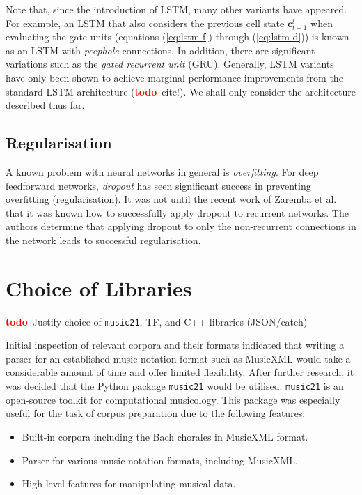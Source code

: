 \documentclass[12pt,a4paper,twoside,openright]{report}
\newcommand{\vect}[1]{\boldsymbol{\mathbf{#1}}}
\newcommand{\todo}{\textcolor{red}{\textbf{todo}~}}
\begin{document}
Note that, since the introduction of LSTM, many other variants have appeared.
For example, an LSTM that also considers the previous cell state
$\vect{c}_{t-1}^l$ when evaluating the gate units (equations (\ref{eq:lstm-f})
through (\ref{eq:lstm-d})) is known as an LSTM with \emph{peephole} connections.
In addition, there are significant variations such as the \emph{gated recurrent
unit} (GRU). Generally, LSTM variants have only been shown to achieve marginal
performance improvements from the standard LSTM architecture (\todo cite!). We
shall only consider the architecture described thus far.

\subsection{Regularisation}

A known problem with neural networks in general is \emph{overfitting}. For deep
feedforward networks, \emph{dropout} \cite{srivastava2014dropout} has seen
significant success in preventing overfitting (regularisation). It was not until
the recent work of Zaremba et al.\ \cite{zaremba2014recurrent} that it was known
how to successfully apply dropout to recurrent networks. The authors determine
that applying dropout to only the non-recurrent connections in the network leads
to successful regularisation. 

\section{Choice of Libraries}

\todo Justify choice of \texttt{music21}, TF, and C++ libraries (JSON/catch)

Initial inspection of relevant corpora and their formats indicated that writing
a parser for an established music notation format such as MusicXML would take a
considerable amount of time and offer limited flexibility. After further
research, it was decided that the Python package \texttt{music21} would be
utilised. \texttt{music21} is an open-source toolkit for computational
musicology. This package was especially useful for the task of corpus
preparation due to the following features:
\begin{itemize}
  \item Built-in corpora including the Bach chorales in MusicXML format.
  \item Parser for various music notation formats, including MusicXML.
  \item High-level features for manipulating musical data.
\end{itemize}
\end{document}
